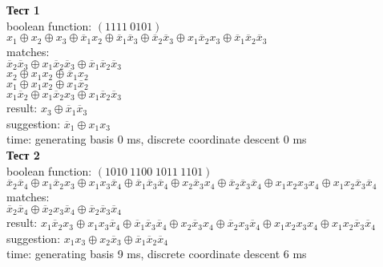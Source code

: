 \documentclass[a4paper,12pt,titlepage,finall]{article}
\begin{document}
\textbf{Тест 1}
\\boolean function: $(1111\:0101)$
\: $x_1 \oplus x_2 \oplus x_3 \oplus \overline x_1 x_2 \oplus \overline x_1 \overline x_3 \oplus \overline x_2 \overline x_3 \oplus x_1 \overline x_2 x_3 \oplus \overline x_1 \overline x_2 \overline x_3$
\\matches:
\\$\overline x_2 \overline x_3 \oplus x_1 \overline x_2 \overline x_3 \oplus \overline x_1 \overline x_2 \overline x_3$
\\$x_2 \oplus x_1 x_2 \oplus \overline x_1 x_2$
\\$x_1 \oplus x_1 x_2 \oplus x_1 \overline x_2$
\\$x_1 \overline x_2 \oplus x_1 \overline x_2 x_3 \oplus x_1 \overline x_2 \overline x_3$
\\result: $x_3 \oplus \overline x_1 \overline x_3$
\\suggestion: $\overline x_1 \oplus x_1 x_3$
\\time: generating basis 0 ms, discrete coordinate descent 0 ms\\

\textbf{Тест 2}
\\boolean function: $(1010\:1100\;1011\:1101)$
\: $\overline x_2 \overline x_4 \oplus x_1 \overline x_2 x_3 \oplus x_1 x_3 \overline x_4 \oplus \overline x_1 \overline x_3 \overline x_4 \oplus x_2 \overline x_3 x_4 \oplus \overline x_2 \overline x_3 \overline x_4 \oplus x_1 x_2 x_3 x_4 \oplus x_1 x_2 \overline x_3 \overline x_4$
\\matches:
\\$\overline x_2 \overline x_4 \oplus \overline x_2 x_3 \overline x_4 \oplus \overline x_2 \overline x_3 \overline x_4$
\\result: $x_1 \overline x_2 x_3 \oplus x_1 x_3 \overline x_4 \oplus \overline x_1 \overline x_3 \overline x_4 \oplus x_2 \overline x_3 x_4 \oplus \overline x_2 x_3 \overline x_4 \oplus x_1 x_2 x_3 x_4 \oplus x_1 x_2 \overline x_3 \overline x_4$
\\suggestion: $x_1 x_3 \oplus x_2 \overline x_3 \oplus \overline x_1 \overline x_2 \overline x_4$
\\time: generating basis 9 ms, discrete coordinate descent 6 ms\\
\end{document}
